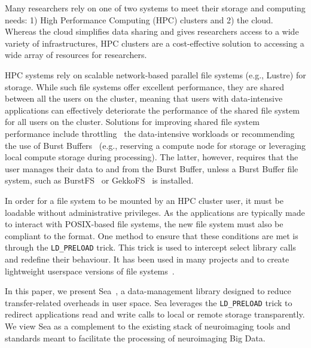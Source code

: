 \documentclass[pdflatex,sn-mathphys-num]{sn-jnl}
\theoremstyle{thmstyleone}%
\theoremstyle{thmstyletwo}%
\theoremstyle{thmstylethree}%
\begin{document}
    Many researchers rely on one of two systems to meet their storage and
    computing needs: 1) High Performance Computing (HPC) clusters and 2) the
    cloud. Whereas the cloud simplifies data sharing and gives researchers
    access to a wide variety of infrastructures, HPC clusters are a
    cost-effective solution to accessing a wide array of resources for
    researchers. %
    
    HPC systems rely on scalable network-based parallel file systems (e.g.,
    Lustre) for storage. While such file systems offer excellent performance,
    they are shared between all the users on the cluster, meaning that users
    with data-intensive applications can effectively deteriorate the performance
    of the shared file system for all users on the cluster. Solutions for
    improving shared file system performance include
    throttling~\cite{huang2020ooops} the data-intensive workloads or
    recommending the use of Burst Buffers~\cite{bb} (e.g., reserving a compute
    node for storage or leveraging local compute storage during processing). The
    latter, however, requires that the user manages their data to and from the
    Burst Buffer, unless a Burst Buffer file system, such as
    BurstFS~\cite{burstfs} or GekkoFS~\cite{gekkofs} is installed.
    
    In order for a file system to be mounted by an HPC cluster user, it must be
    loadable without administrative privileges. As the applications are
    typically made to interact with POSIX-based file systems, the new file
    system must also be compliant to the format. One method to ensure that these
    conditions are met is through the \texttt{LD\_PRELOAD} trick. This trick is
    used to intercept select library calls and redefine their behaviour. It has
    been used in many projects and to create lightweight userspace versions of
    file systems~\cite{xtreemfs,burstfs,gekkofs}. 
    
    In this paper, we present Sea~\cite{hayot2022sea}, a data-management library designed to reduce
    transfer-related overheads in user space. Sea leverages the \texttt{LD\_PRELOAD} trick to redirect applications read and write calls to 
    local or remote storage transparently. We view Sea as a complement
    to the existing stack of neuroimaging tools and standards meant to facilitate 
    the processing of neuroimaging Big Data.   
    
\end{document}
